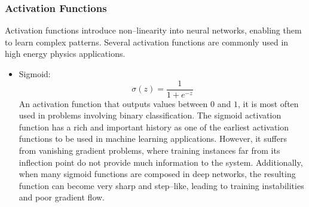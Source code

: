         \subsubsection{Activation Functions}
            Activation functions introduce non--linearity into neural networks, enabling them to learn complex patterns.
            Several activation functions are commonly used in high energy physics applications.
            \begin{itemize}
                \item Sigmoid:
                    \[\sigma(z) = \frac{1}{1 + e^{-z}}\]
                    An activation function that outputs values between \(0\) and \(1\), it is most often used in problems involving binary classification.
                    The sigmoid activation function has a rich and important history as one of the earliest activation functions to be used in machine learning applications.
                    However, it suffers from vanishing gradient problems, where training instances far from its inflection point do not provide much information to the system.
                    Additionally, when many sigmoid functions are composed in deep networks, the resulting function can become very sharp and step--like, leading to training instabilities and poor gradient flow.


\end{itemize}
